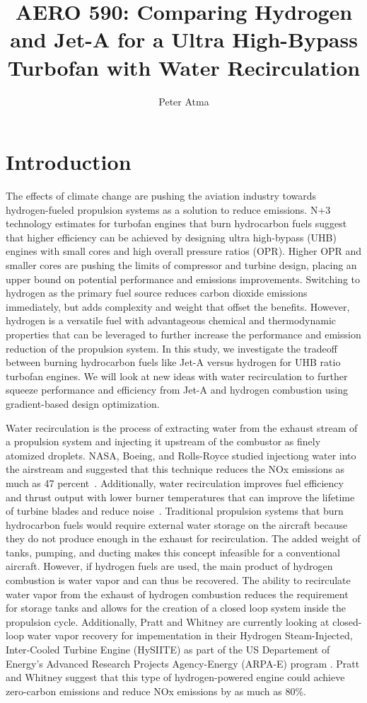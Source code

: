 \documentclass[12pt]{new-aiaa}
\title{AERO 590: Comparing Hydrogen and Jet-A for a Ultra High-Bypass Turbofan with Water Recirculation}
\author{Peter Atma}
\begin{document}
\maketitle

\section{Introduction}
The effects of climate change are pushing the aviation industry towards hydrogen-fueled propulsion systems as a solution to reduce emissions.
N+3 technology estimates for turbofan engines that burn hydrocarbon fuels suggest that higher efficiency can be achieved by designing ultra high-bypass (UHB) engines with small cores and high overall pressure ratios (OPR).
Higher OPR and smaller cores are pushing the limits of compressor and turbine design, placing an upper bound on potential performance and emissions improvements.
Switching to hydrogen as the primary fuel source reduces carbon dioxide emissions immediately, but adds complexity and weight that offset the benefits.
However, hydrogen is a versatile fuel with advantageous chemical and thermodynamic properties that can be leveraged to further increase the performance and emission reduction of the propulsion system.
In this study, we investigate the tradeoff between burning hydrocarbon fuels like Jet-A versus hydrogen for UHB ratio turbofan engines.
We will look at new ideas with water recirculation to further squeeze performance and efficiency from Jet-A and hydrogen combustion using gradient-based design optimization.

Water recirculation is the process of extracting water from the exhaust stream of a propulsion system and injecting it upstream of the combustor as finely atomized droplets.
NASA, Boeing, and Rolls-Royce studied injectiong water into the airstream and suggested that this technique reduces the NOx emissions as much as 47 percent~\cite{nasa_inject}.
Additionally, water recirculation improves fuel efficiency and thrust output with lower burner temperatures that can improve the lifetime of turbine blades and reduce noise~\cite{nasa_inject}.
Traditional propulsion systems that burn hydrocarbon fuels would require external water storage on the aircraft because they do not produce enough in the exhaust for recirculation.
The added weight of tanks, pumping, and ducting makes this concept infeasible for a conventional aircraft.
However, if hydrogen fuels are used, the main product of hydrogen combustion is water vapor and can thus be recovered.
The ability to recirculate water vapor from the exhaust of hydrogen combustion reduces the requirement for storage tanks and allows for the creation of a closed loop system inside the propulsion cycle.
Additionally, Pratt and Whitney are currently looking at closed-loop water vapor recovery for impementation in their Hydrogen Steam-Injected, Inter‐Cooled Turbine Engine (HySIITE) as part of the US Departement of Energy's Advanced Research Projects Agency-Energy (ARPA-E) program \cite{hysiite}.
Pratt and Whitney suggest that this type of hydrogen-powered engine could achieve zero-carbon emissions and reduce NOx emissions by as much as 80\%.
\end{document}
